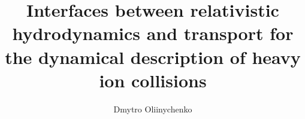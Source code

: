 \documentclass[hyperpdf,bindnopdf,oneside]{hepthesis}
\title{Interfaces between relativistic hydrodynamics and transport for the dynamical description of heavy ion collisions}
\author{Dmytro Oliinychenko}
\begin{document}
\begin{frontmatter}
  
\end{frontmatter}

\begin{mainmatter}
  
  
  
  
  
  
  
\end{mainmatter}

\begin{appendices}
  
\end{appendices}

\begin{backmatter}
  
\end{backmatter}

\end{document}
